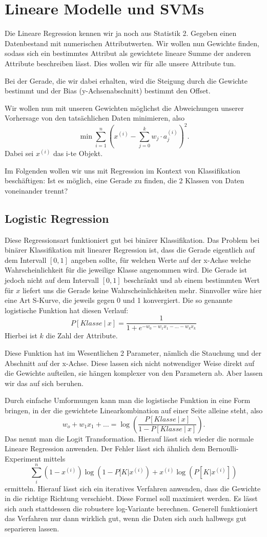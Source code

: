 \section{Lineare Modelle und SVMs}
Die Lineare Regression kennen wir ja noch aus Statistik 2.
Gegeben einen Datenbestand mit numerischen Attributwerten.
Wir wollen nun Gewichte finden, sodass sich ein bestimmtes Attribut
als gewichtete lineare Summe der anderen Attribute beschreiben lässt.
Dies wollen wir für alle unsere Attribute tun.

Bei der Gerade, die wir dabei erhalten, wird die Steigung durch
die Gewichte bestimmt und der Bias (y-Achsenabschnitt) bestimmt
den Offset.  

Wir wollen nun mit unseren Gewichten möglichst die Abweichungen
unserer Vorhersage von den tatsächlichen Daten minimieren, also
\[ \min \sum_{i=1}^{n}\left( x^{(i)} - 
\sum_{j=0}^k w_j \cdot a_j^{(i)}\right)^2 .\]
Dabei sei \(x^{(i)}\) das i-te Objekt.

Im Folgenden wollen wir uns mit Regression im Kontext von
Klassifikation beschäftigen: Ist es möglich, eine Gerade zu finden,
die 2 Klassen von Daten voneinander trennt?

\subsection{Logistic Regression}
Diese Regressionsart funktioniert gut bei binärer Klassifikation.
Das Problem bei binärer Klassifikation mit linearer Regression ist,
dass die Gerade eigentlich auf dem Intervall \([0,1]\) angeben sollte,
für welchen Werte auf der x-Achse welche Wahrscheinlichkeit für
die jeweilige Klasse angenommen wird. Die Gerade ist jedoch nicht auf
dem Intervall \([0,1]\) beschränkt und ab einem bestimmten Wert
für \(x\) liefert uns die Gerade keine Wahrscheinlichkeiten mehr.
Sinnvoller wäre hier eine Art S-Kurve, die jeweils gegen 0 und 1 konvergiert.
Die so genannte logistische Funktion hat diesen Verlauf:
\[P[Klasse\ |\ x]= \frac{1}{1+e^{-w_0 - w_1 x_1 - \dots - w_k x_k}}\]
Hierbei ist \(k\) die Zahl der Attribute.

Diese Funktion hat im Wesentlichen 2 Parameter, nämlich die Stauchung
und der Abschnitt auf der x-Achse. Diese lassen sich nicht notwendiger
Weise direkt auf die Gewichte aufteilen, sie hängen komplexer von 
den Parametern ab. Aber lassen wir das auf sich beruhen.

Durch einfache Umformungen kann man die logistische Funktion in eine
Form bringen, in der  die gewichtete Linearkombination auf einer Seite
alleine steht, also 
\[w_o + w_1 x_1 + \dots = \log \left(
\frac{P[Klasse\ |\ x]}{1 - P[Klasse\ |\ x]}\right).\]
Das nennt man die Logit Transformation. Hierauf lässt sich wieder die
normale Lineare Regression anwenden. Der Fehler lässt sich ähnlich
dem Bernoulli-Experiment mittels
\[\sum_i^n (1-x^{(i)})\log(1-P[K|x^{(i)}) + 
x^{(i)}\log(P[K|x^{(i)}])\]
ermitteln. Hierauf lässt sich ein iteratives Verfahren anwenden, dass die Gewichte
in die richtige Richtung verschiebt. Diese Formel soll maximiert werden.
Es lässt sich auch stattdessen die robustere log-Variante berechnen. 
Generell funktioniert das Verfahren nur dann wirklich gut, wenn die 
Daten sich auch halbwegs gut separieren lassen.

